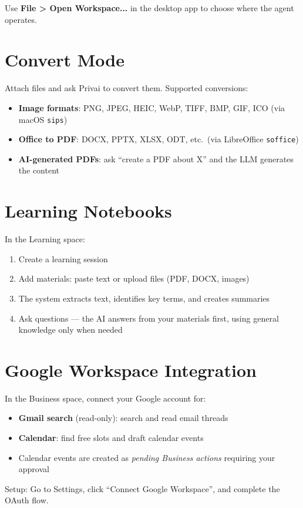 \documentclass[a4paper,11pt,twoside]{report}
\begin{document}
Use \textbf{File > Open Workspace...} in the desktop app to choose where the agent operates.

\section{Convert Mode}
Attach files and ask Privai to convert them. Supported conversions:
\begin{itemize}
  \item \textbf{Image formats}: PNG, JPEG, HEIC, WebP, TIFF, BMP, GIF, ICO (via macOS \texttt{sips})
  \item \textbf{Office to PDF}: DOCX, PPTX, XLSX, ODT, etc.\ (via LibreOffice \texttt{soffice})
  \item \textbf{AI-generated PDFs}: ask ``create a PDF about X'' and the LLM generates the content
\end{itemize}

\section{Learning Notebooks}
In the Learning space:
\begin{enumerate}
  \item Create a learning session
  \item Add materials: paste text or upload files (PDF, DOCX, images)
  \item The system extracts text, identifies key terms, and creates summaries
  \item Ask questions --- the AI answers from your materials first, using general knowledge only when needed
\end{enumerate}

\section{Google Workspace Integration}
In the Business space, connect your Google account for:
\begin{itemize}
  \item \textbf{Gmail search} (read-only): search and read email threads
  \item \textbf{Calendar}: find free slots and draft calendar events
  \item Calendar events are created as \emph{pending Business actions} requiring your approval
\end{itemize}

Setup: Go to Settings, click ``Connect Google Workspace'', and complete the OAuth flow.
\end{document}
